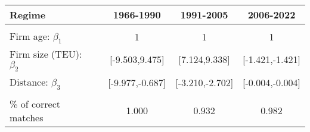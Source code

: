 
\begin{tabular}[t]{lcccc}
\toprule
Regime &  & 1966-1990 & 1991-2005 & 2006-2022\\
\midrule
 &  &  &  \vphantom{1} & \\
Firm age: $\beta_1$ &  & 1 & 1 & 1\\
Firm size (TEU): $\beta_2$ &  & {}[-9.503,9.475] & {}[7.124,9.338] & {}[-1.421,-1.421]\\
Distance: $\beta_3$ &  & {}[-9.977,-0.687] & {}[-3.210,-2.702] & {}[-0.004,-0.004]\\
 &  &  &  & \\
\% of correct matches &  & 1.000 & 0.932 & 0.982\\
\bottomrule
\end{tabular}
